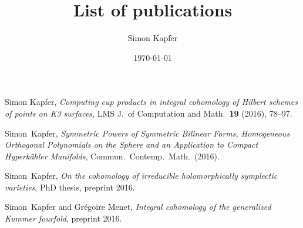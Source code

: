 \documentclass[11pt,a4paper,sans,english]{article}
\title{List of publications}
\author{Simon Kapfer}
\date{\today}
\begin{document}
\maketitle
\thispagestyle{plain}


\renewcommand{\section}[2]{}

\begin{thebibliography}{10}

Simon Kapfer, \emph{Computing cup products in integral cohomology of Hilbert schemes of points on K3 surfaces},
  LMS J.~of Computation and Math.~\textbf{19} (2016), 78--97.

Simon~Kapfer, \emph{Symmetric Powers of Symmetric Bilinear Forms, Homogeneous Orthogonal Polynomials 
  on the Sphere and an Application to Compact Hyperk\"ahler Manifolds}, Commun.~Contemp.~Math.~(2016).

Simon~Kapfer, \emph{On the cohomology of irreducible holomorphically symplectic varieties}, PhD thesis, preprint 2016.

Simon~Kapfer and Gr\'egoire Menet, \emph{Integral cohomology of the generalized Kummer fourfold}, preprint 2016.

  
\end{thebibliography}
\end{document}
